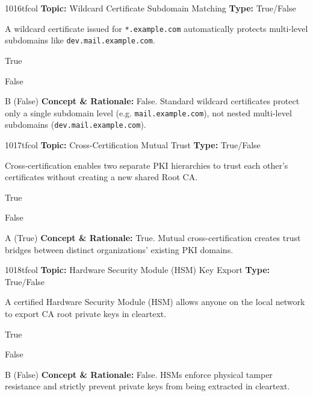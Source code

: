 \begin{qcard}{1016}{tfcol}
\textcolor{darkslate!75}{\small\textbf{Topic:} Wildcard Certificate Subdomain Matching \hfill \textbf{Type:} True/False}\vspace{0.4em}\par
A wildcard certificate issued for \texttt{*.example.com} automatically protects multi-level subdomains like \texttt{dev.mail.example.com}.
\begin{qoptions}
\item True
\item False
\end{qoptions}
\end{qcard}
\nopagebreak
\begin{explainbox}{B (False)}
\textbf{Concept \& Rationale:} False. Standard wildcard certificates protect only a single subdomain level (e.g. \texttt{mail.example.com}), not nested multi-level subdomains (\texttt{dev.mail.example.com}).
\end{explainbox}

\begin{qcard}{1017}{tfcol}
\textcolor{darkslate!75}{\small\textbf{Topic:} Cross-Certification Mutual Trust \hfill \textbf{Type:} True/False}\vspace{0.4em}\par
Cross-certification enables two separate PKI hierarchies to trust each other's certificates without creating a new shared Root CA.
\begin{qoptions}
\item True
\item False
\end{qoptions}
\end{qcard}
\nopagebreak
\begin{explainbox}{A (True)}
\textbf{Concept \& Rationale:} True. Mutual cross-certification creates trust bridges between distinct organizations' existing PKI domains.
\end{explainbox}

\begin{qcard}{1018}{tfcol}
\textcolor{darkslate!75}{\small\textbf{Topic:} Hardware Security Module (HSM) Key Export \hfill \textbf{Type:} True/False}\vspace{0.4em}\par
A certified Hardware Security Module (HSM) allows anyone on the local network to export CA root private keys in cleartext.
\begin{qoptions}
\item True
\item False
\end{qoptions}
\end{qcard}
\nopagebreak
\begin{explainbox}{B (False)}
\textbf{Concept \& Rationale:} False. HSMs enforce physical tamper resistance and strictly prevent private keys from being extracted in cleartext.
\end{explainbox}

